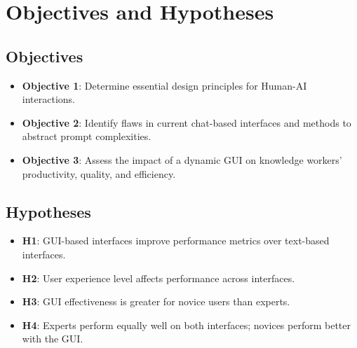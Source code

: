 
\chapter{Objectives and Hypotheses}\label{chapter:objectives-hypotheses}

\section{Objectives}
\begin{itemize}
    \item \textbf{Objective 1}: Determine essential design principles for Human-AI interactions.
    \item \textbf{Objective 2}: Identify flaws in current chat-based interfaces and methods to abstract prompt complexities.
    \item \textbf{Objective 3}: Assess the impact of a dynamic GUI on knowledge workers' productivity, quality, and efficiency.
\end{itemize}

\section{Hypotheses}
\begin{itemize}
    \item \textbf{H1}: GUI-based interfaces improve performance metrics over text-based interfaces.
    \item \textbf{H2}: User experience level affects performance across interfaces.
    \item \textbf{H3}: GUI effectiveness is greater for novice users than experts.
    \item \textbf{H4}: Experts perform equally well on both interfaces; novices perform better with the GUI.
\end{itemize}